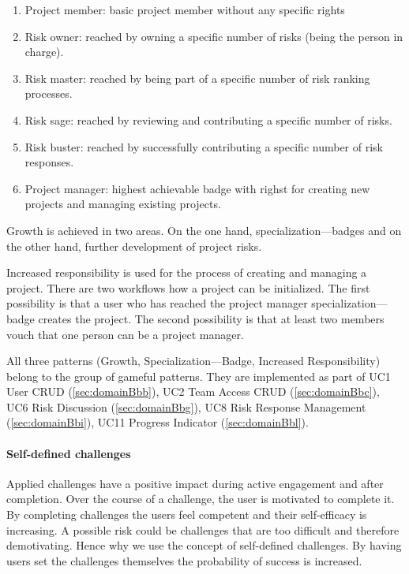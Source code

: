 \begin{enumerate}
	\item Project member: basic project member without any specific rights
	\item Risk owner: reached by owning a specific number of risks (being the person in charge).
	\item Risk master: reached by being part of a specific number of risk ranking processes.
	\item Risk sage: reached by reviewing and contributing a specific number of risks.
	\item Risk buster: reached by successfully contributing a specific number of risk responses.
	\item Project manager: highest achievable badge with righst for creating new projects and managing existing projects.
\end{enumerate}

Growth is achieved in two areas. On the one hand, specialization—badges and on the other hand, further development of project risks.

Increased responsibility is used for the process of creating and managing a project. There are two workflows how a project can be initialized. The first possibility is that a user who has reached the project manager specialization—badge creates the project. The second possibility is that at least two members vouch that one person can be a project manager.

All three patterns (Growth, Specialization—Badge, Increased Responsibility) belong to the group of gameful patterns.
They are implemented as part of \ac{UC}1 User CRUD (\ref{sec:domainBbb}), \ac{UC}2 Team Access CRUD (\ref{sec:domainBbc}), \ac{UC}6 Risk Discussion (\ref{sec:domainBbg}), \ac{UC}8 Risk Response Management (\ref{sec:domainBbi}), \ac{UC}11 Progress Indicator (\ref{sec:domainBbl}).

\paragraph*{Self-defined challenges}

Applied challenges have a positive impact during active engagement and after completion. Over the course of a challenge, the user is motivated to complete it. By completing challenges the users feel competent and their self-efficacy is increasing. A possible risk could be challenges that are too difficult and therefore demotivating. Hence why we use the concept of self-defined challenges. By having users set the challenges themselves the probability of success is increased.

